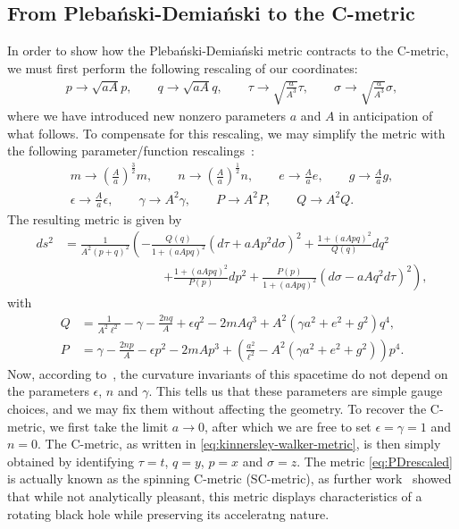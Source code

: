 \documentclass[
twoside,
openright,
frontopenright
]{dmathesis}
\newcommand{\nn}{\nonumber}
\newcommand{\PD}{Pleba\'nski-Demia\'nski}
\begin{document}
\subsection{From \PD{} to the C-metric}
\label{sec:PDtoC}

In order to show how the \PD{} metric contracts to the C-metric, we must first
perform the following rescaling of our coordinates:
\begin{align}
  p\to\sqrt{aA}p, \qquad q\to\sqrt{aA} q, \qquad
  \tau\to\sqrt{\frac{a}{A^3}}\tau, \qquad \sigma\to\sqrt{\frac{a}{A^3}}\sigma,
\end{align}
where we have introduced new nonzero parameters $a$ and $A$ in anticipation of
what follows. To compensate for this rescaling, we may simplify the metric with
the following parameter/function rescalings~\cite{Plebanski:1976gy,Pravda:2002kj}:
\begin{gather}
  m\to \left(\frac{A}{a}\right)^\frac32 m, \qquad n\to
  \left(\frac{A}{a}\right)^\frac12 n, \qquad e\to\frac{A}{a}e, \qquad
  g\to\frac{A}{a}g,\nn\\
  \epsilon\to \frac{A}{a}\epsilon, \qquad \gamma\to A^2\gamma, \qquad P\to A^2P,
  \qquad Q\to A^2 Q.
\end{gather}
The resulting metric is given by
\begin{align}
  \label{eq:PDrescaled}
  ds^2 &= \frac{1}{A^2(p + q)^2} \left( - \frac{Q(q)}{1+(aApq)^2}(d\tau + aAp^2
         d\sigma)^2 + \frac{1+(aApq)^2}{Q(q)}dq^2 \right.\nn\\
  &\hspace{8em}\left. + \frac{1+(aApq)^2}{P(p)}dp^2 +
         \frac{P(p)}{1+(aApq)^2}(d\sigma - aAq^2 d\tau)^2 \right),
\end{align}
with
\begin{align}
  \label{eq:PDfnrescaled}
  Q &= \frac{1}{A^2\ell^2} - \gamma - \frac{2nq}{A} + \epsilon q^2 -
      2mAq^3 + A^2\left(\gamma a^2 + e^2 + g^2\right)q^4,\nn\\
  P &=  \gamma - \frac{2np}{A} - \epsilon p^2 -
      2mAp^3 + \left(\frac{a^2}{\ell^2} - A^2(\gamma a^2+e^2+g^2)\right)p^4.
\end{align}
Now, according to~\cite{Plebanski:1976gy}, the curvature invariants of this
spacetime do not depend on the parameters $\epsilon$, $n$ and $\gamma$. This
tells us that these parameters are simple gauge choices, and we may fix them
without affecting the geometry. To recover the C-metric, we first take the limit
$a\to 0$, after which we are free to set $\epsilon=\gamma=1$ and $n=0$. The
C-metric, as written in \cref{eq:kinnersley-walker-metric}, is then simply
obtained by identifying $\tau=t$, $q=y$, $p=x$ and $\sigma=z$. The metric
\eqref{eq:PDrescaled} is actually known as the spinning C-metric (SC-metric),
as further
work~\cite{Farhoosh:1980zz,Bicak:1999sa,Letelier:1998rx,Pravda:2002kj} showed
that while not analytically pleasant, this metric displays characteristics of a
rotating black hole while preserving its acceleratng nature.
\end{document}
